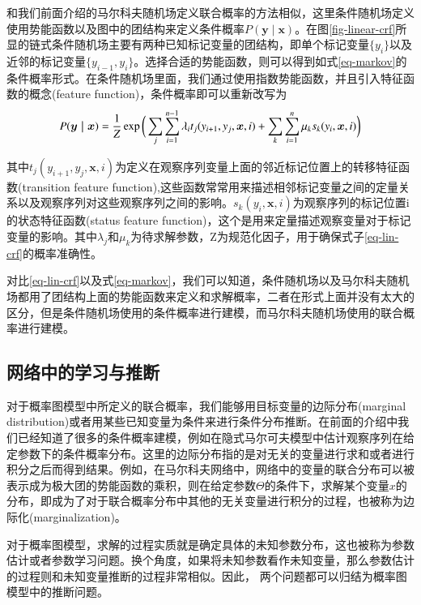 和我们前面介绍的马尔科夫随机场定义联合概率的方法相似，这里条件随机场定义使用势能函数以及图中的团结构来定义条件概率$P(\bm{y \mid x})$。在图\ref{fig-linear-crf}所显的链式条件随机场主要有两种已知标记变量的团结构，即单个标记变量$\{y_i\}$以及近邻的标记变量$\{y_{i-1}, y_i\}$。选择合适的势能函数，则可以得到如式\ref{eq-markov}的条件概率形式。在条件随机场里面，我们通过使用指数势能函数，并且引入特征函数的概念(feature function)，条件概率即可以重新改写为
\begin{equation}
	P(\bm{y \mid x}) = \frac{1}{Z} \exp \bigg(\sum_j \sum_{i = 1}^{n - 1} \lambda_i t_j (y_{i+1}, y_j, \bm{x}, i) + \sum_{k} \sum_{i= 1}^{n} \mu_{k} s_{k}(y_i, \bm{x}, i) \bigg) \\
	\label{eq-lin-crf}
\end{equation}


其中$t_j (y_{i+1}, y_j, \bm{x}, i) $为定义在观察序列变量上面的邻近标记位置上的转移特征函数(transition feature function),这些函数常常用来描述相邻标记变量之间的定量关系以及观察序列对这些观察序列之间的影响。$s_{k}(y_i, \bm{x}, i) $为观察序列的标记位置i的状态特征函数(status feature function)，这个是用来定量描述观察变量对于标记变量的影响。其中$\lambda_j$和$\mu_k$为待求解参数，Z为规范化因子，用于确保式子\ref{eq-lin-crf}的概率准确性。



对比\ref{eq-lin-crf}以及式\ref{eq-markov}，我们可以知道，条件随机场以及马尔科夫随机场都用了团结构上面的势能函数来定义和求解概率，二者在形式上面并没有太大的区分，但是条件随机场使用的条件概率进行建模，而马尔科夫随机场使用的联合概率进行建模。



\subsection{网络中的学习与推断}
对于概率图模型中所定义的联合概率，我们能够用目标变量的边际分布(marginal distribution)或者用某些已知变量为条件来进行条件分布推断。在前面的介绍中我们已经知道了很多的条件概率建模，例如在隐式马尔可夫模型中估计观察序列在给定参数下的条件概率分布。这里的边际分布指的是对无关的变量进行求和或者进行积分之后而得到结果。例如，在马尔科夫网络中，网络中的变量的联合分布可以被表示成为极大团的势能函数的乘积，则在给定参数$\Theta$的条件下，求解某个变量$x$的分布，即成为了对于联合概率分布中其他的无关变量进行积分的过程，也被称为边际化(marginalization)。

对于概率图模型，求解的过程实质就是确定具体的未知参数分布，这也被称为参数估计或者参数学习问题。换个角度，如果将未知参数看作未知变量，那么参数估计的过程则和未知变量推断的过程非常相似。因此， 两个问题都可以归结为概率图模型中的推断问题。

